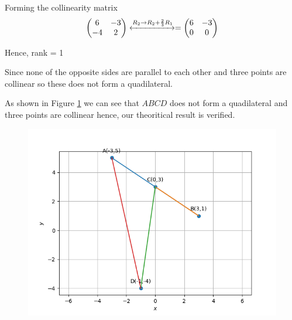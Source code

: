 \documentclass[12pt]{article}
\newcommand{\myvec}[1]{\ensuremath{\begin{pmatrix}#1\end{pmatrix}}}
\begin{document}
\begin{enumerate}
\begin{enumerate}
	Forming the collinearity matrix
	\begin{align}
		\myvec{6&-3\\-4&2} \xleftrightarrow{R_{2}\rightarrow R_{2}+\frac{2}{3}R_{1}}= \myvec{6&-3\\0&0}
	\end{align}
	\end{enumerate}
	Hence, rank = 1

	Since none of the opposite sides are parallel to each other and three points are collinear so these does not form a quadilateral.

	As shown in Figure \ref{fig:Fig2} we can see that $ABCD$ does not form a quadilateral and three points are collinear hence, our theoritical result is verified.
	
\begin{figure}[!h]
	\begin{center} 
	    \includegraphics[width=\columnwidth]{figs/quad2}
	\end{center}
\caption{}
\label{fig:Fig2}
\end{figure}
	

\end{enumerate}
\end{document}
